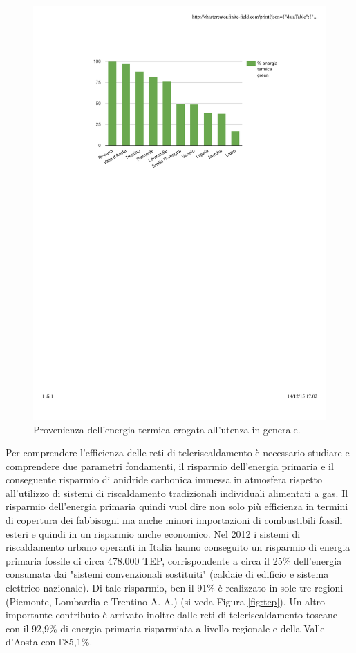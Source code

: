 \documentclass[laurea,oneside,11pt]{USiena_tesiLM}
\begin{document}
\begin{figure}[!ht]
\centering
\includegraphics[width=\textwidth]{figure/energia_green} 
\caption{Provenienza dell'energia termica erogata all'utenza in generale.}
\label{fig:energia_green}
\end{figure}

Per comprendere l'efficienza delle reti di teleriscaldamento è necessario studiare e comprendere due parametri fondamenti, il risparmio dell'energia primaria e il conseguente risparmio di anidride carbonica immessa in atmosfera rispetto all'utilizzo di sistemi di riscaldamento tradizionali individuali alimentati a gas. Il risparmio dell'energia primaria quindi vuol dire non solo più efficienza in termini di copertura dei fabbisogni ma anche minori importazioni di combustibili fossili esteri e quindi in un risparmio anche economico. Nel 2012 i sistemi di riscaldamento urbano operanti in Italia hanno conseguito un risparmio di energia primaria fossile di circa 478.000 TEP, corrispondente a circa il 25\% dell'energia consumata dai "sistemi convenzionali sostituiti" (caldaie di edificio e sistema elettrico nazionale). Di tale risparmio, ben il 91\% è realizzato in sole tre regioni (Piemonte, Lombardia e Trentino A. A.) (si veda Figura \ref{fig:tep}). 
Un altro importante contributo è arrivato inoltre dalle reti di teleriscaldamento toscane con il 92,9\% di energia primaria risparmiata a livello regionale e della Valle d'Aosta con l'85,1\%.
\end{document}
